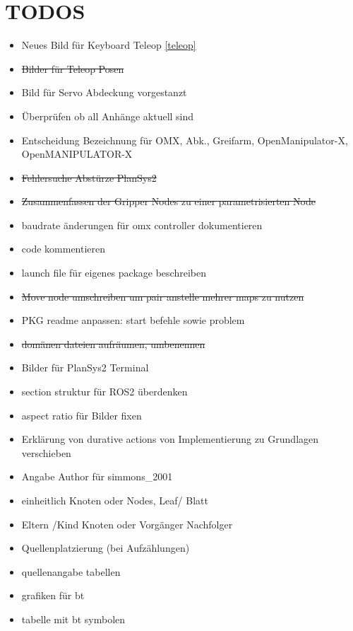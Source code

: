 \section{TODOS}
\begin{itemize}
\item Neues Bild für Keyboard Teleop \ref{teleop}
\item \sout{Bilder für Teleop Posen}
\item Bild für Servo Abdeckung vorgestanzt
\item Überprüfen ob all Anhänge aktuell sind
\item Entscheidung Bezeichnung für OMX, Abk., Greifarm, OpenManipulator-X, OpenMANIPULATOR-X
\item \sout{Fehlersuche Abstürze PlanSys2}
\item \sout{Zusammenfassen der Gripper Nodes zu einer parametrisierten Node}
\item baudrate änderungen für omx controller dokumentieren
\item code kommentieren
\item launch file für eigenes package beschreiben
\item \sout{Move node umschreiben um pair anstelle mehrer maps zu nutzen}
\item PKG readme anpassen: start befehle sowie problem
\item \sout{domänen dateien aufräumen, umbenennen}
\item Bilder für PlanSys2 Terminal
\item section struktur für ROS2 überdenken
\item aspect ratio für Bilder fixen
    \item Erklärung von durative actions von Implementierung zu Grundlagen verschieben
    \item Angabe Author für simmons\_2001
    \item einheitlich Knoten oder Nodes, Leaf/ Blatt
    \item Eltern /Kind Knoten oder Vorgänger Nachfolger
    \item Quellenplatzierung (bei Aufzählungen)
    \item quellenangabe tabellen
    \item grafiken für bt
    \item tabelle mit bt symbolen
\end{itemize}